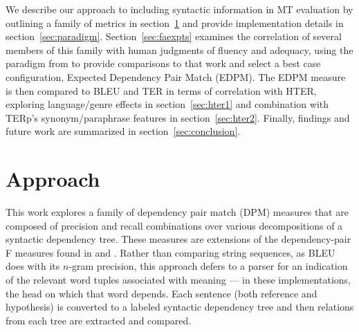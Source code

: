 \documentclass{kluwer}    %
\begin{document}
\begin{article}
We describe our approach to including syntactic information in MT
evaluation by outlining a family of metrics in
section~\ref{sec:approach} and provide implementation details in
section~\ref{sec:paradigm}.  Section~\ref{sec:faexpts} examines the
correlation of several members of this family with human judgments of
fluency and adequacy, using the paradigm from
\cite{owczarzak07evaluatingmt} to provide comparisons to that work and
select a best case configuration, Expected Dependency Pair Match
(EDPM). The EDPM measure is then compared to BLEU and TER in terms of
correlation with HTER, exploring language/genre effects in
section~\ref{sec:hter1} and combination with TERp's synonym/paraphrase
features in section~\ref{sec:hter2}. Finally, findings and future work
are summarized in section~\ref{sec:conclusion}.

\section{Approach}
\label{sec:approach}

This work explores a family of dependency pair match (DPM) measures
that are composed of precision and recall combinations over various
decompositions of a syntactic dependency tree. These measures are
extensions of the dependency-pair F measures found in
 and
.  Rather than comparing
string sequences, as BLEU does with its $n$-gram precision, this
approach defers to a parser for an indication of the relevant word
tuples associated with meaning --- in these implementations, the head
on which that word depends.  Each sentence (both reference and
hypothesis) is converted to a labeled syntactic dependency tree and
then relations from each tree are extracted and compared.


\end{article}
\end{document}
